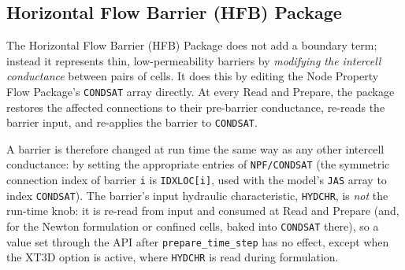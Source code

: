 \subsection{Horizontal Flow Barrier (HFB) Package}

The Horizontal Flow Barrier (HFB) Package does not add a boundary term; instead it
represents thin, low-permeability barriers by \emph{modifying the intercell
conductance} between pairs of cells. It does this by editing the Node Property
Flow Package's \texttt{CONDSAT} array directly. At every Read and Prepare, the
package restores the affected connections to their pre-barrier conductance,
re-reads the barrier input, and re-applies the barrier to \texttt{CONDSAT}.

A barrier is therefore changed at run time the same way as any other intercell
conductance: by setting the appropriate entries of \texttt{NPF/CONDSAT} (the
symmetric connection index of barrier \texttt{i} is \texttt{IDXLOC[i]}, used with
the model's \texttt{JAS} array to index \texttt{CONDSAT}). The barrier's input
hydraulic characteristic, \texttt{HYDCHR}, is \emph{not} the run-time knob: it is
re-read from input and consumed at Read and Prepare (and, for the Newton
formulation or confined cells, baked into \texttt{CONDSAT} there), so a value set
through the API after \texttt{prepare\_time\_step} has no effect, except when the
XT3D option is active, where \texttt{HYDCHR} is read during formulation.

